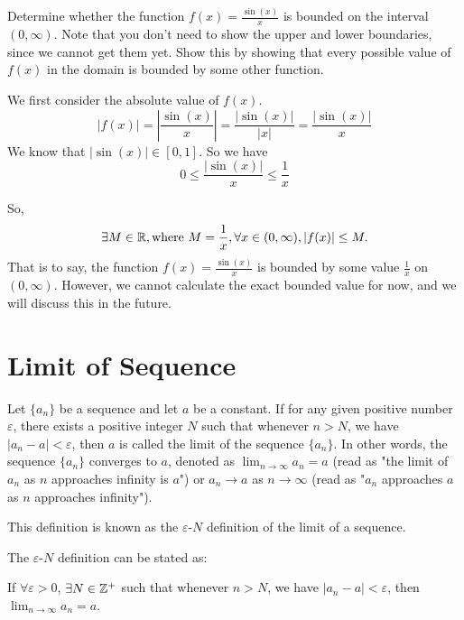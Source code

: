 \begin{exercise}
Determine whether the function \( f(x) = \frac{\sin(x)}{x} \) is bounded on the interval \( (0, \infty) \). Note that you don't need to show the upper and lower boundaries, since we cannot get them yet. Show this by showing that every possible value of $f(x)$ in the domain is bounded by some other function.
\end{exercise}
\begin{solution}
We first consider the absolute value of \( f(x) \).
\[
|f(x)| = \left| \frac{\sin(x)}{x} \right| = \frac{|\sin(x)|}{|x|} = \frac{|\sin(x)|}{x}
\]
We know that \( |\sin(x)| \in [0, 1] \). So we have
\[
0 \leq \frac{|\sin(x)|}{x} \leq \frac{1}{x}
\]

So, \[\exists M\in \mathbb{R}, \text{where } M = \frac{1}{x}, \forall x \in (0, \infty), |f(x)| \leq M.\]
That is to say, the function \( f(x) = \frac{\sin(x)}{x} \) is bounded by some value $\frac{1}{x}$ on \( (0, \infty) \). However, we cannot calculate the exact bounded value for now, and we will discuss this in the future.
\end{solution}
%

\section{Limit of Sequence}
\begin{definition}
Let $\{a_n\}$ be a sequence and let $a$ be a constant. If for any given positive number $\varepsilon$, there exists a positive integer $N$ such that whenever $n > N$, we have $\left|a_n - a\right| < \varepsilon$, then $a$ is called the limit of the sequence $\{a_n\}$. In other words, the sequence $\{a_n\}$ converges to $a$, denoted as $\lim_{n \to \infty} a_n = a$ (read as "the limit of $a_n$ as $n$ approaches infinity is $a$") or $a_n \to a$ as $n \to \infty$ (read as "$a_n$ approaches $a$ as $n$ approaches infinity").

This definition is known as the $\varepsilon$-$N$ definition of the limit of a sequence.

The $\varepsilon$-$N$ definition can be stated as:

If $\forall \varepsilon > 0$, $\exists N\in \mathbb{Z}^+$ such that whenever $n > N$, we have $\left|a_n - a\right| < \varepsilon$, then $\lim_{n \to \infty} a_n = a$.
\end{definition}

